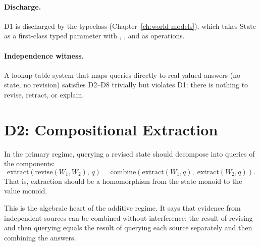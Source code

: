 \paragraph{Discharge.}
D1 is discharged by the  typeclass
(Chapter~\ref{ch:world-models}), which takes $\mathrm{State}$ as a
first-class typed parameter with , , and
 as operations.

\paragraph{Independence witness.}
A lookup-table system that maps queries directly to real-valued
answers (no state, no revision) satisfies D2--D8 trivially but
violates D1: there is nothing to revise, retract, or explain.



\section{D2: Compositional Extraction}
\label{sec:d2}

\begin{definition}
\label{def:d2}
In the primary regime, querying a revised state should decompose into
queries of the components:
\[
  \mathrm{extract}(\mathrm{revise}(W_1, W_2),\, q)
  = \mathrm{combine}(\mathrm{extract}(W_1, q),\;
                       \mathrm{extract}(W_2, q)).
\]
That is, extraction should be a homomorphism from the state monoid to
the value monoid.
\end{definition}

\noindent
This is the algebraic heart of the additive regime.  It says that
evidence from independent sources can be combined without interference:
the result of revising and then querying equals the result of querying
each source separately and then combining the answers.

